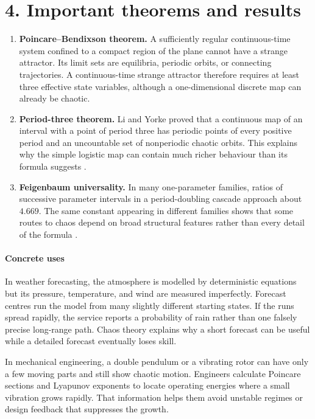 \section*{4. Important theorems and results}
\begin{enumerate}[leftmargin=*,itemsep=0.35em]
\item \textbf{Poincare--Bendixson theorem.} A sufficiently regular continuous-time
system confined to a compact region of the plane cannot have a strange
attractor. Its limit sets are equilibria, periodic orbits, or connecting
trajectories. A continuous-time strange attractor therefore requires at
least three effective state variables, although a one-dimensional discrete
map can already be chaotic.

\item \textbf{Period-three theorem.} Li and Yorke proved that a continuous map of
an interval with a point of period three has periodic points of every
positive period and an uncountable set of nonperiodic chaotic orbits. This
explains why the simple logistic map can contain much richer behaviour than
its formula suggests \cite{chaos_theory_ref2}.

\item \textbf{Feigenbaum universality.} In many one-parameter families, ratios of
successive parameter intervals in a period-doubling cascade approach about
$4.669$. The same constant appearing in different families shows that some
routes to chaos depend on broad structural features rather than every detail
of the formula \cite{chaos_theory_ref1}.
\end{enumerate}

\paragraph{Concrete uses}
In weather forecasting, the atmosphere is modelled by deterministic
equations but its pressure, temperature, and wind are measured imperfectly.
Forecast centres run the model from many slightly different starting states.
If the runs spread rapidly, the service reports a probability of rain rather
than one falsely precise long-range path. Chaos theory explains why a short
forecast can be useful while a detailed forecast eventually loses skill.

In mechanical engineering, a double pendulum or a vibrating rotor can have
only a few moving parts and still show chaotic motion. Engineers calculate
Poincare sections and Lyapunov exponents to locate operating energies where a
small vibration grows rapidly. That information helps them avoid unstable
regimes or design feedback that suppresses the growth.

